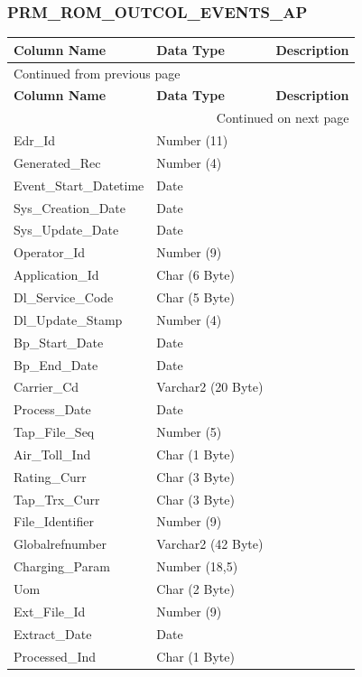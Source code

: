 \documentclass[12pt,twoside]{article}
\begin{document}
\subsubsection{PRM\_ROM\_OUTCOL\_EVENTS\_AP}
\label{sec:orgheadline83}
\footnotesize
\begin{longtable}{l|l|l}
\hline
\textbf{Column Name} & \textbf{Data Type} & \textbf{Description}\\
\hline
\endfirsthead
\multicolumn{3}{l}{Continued from previous page} \\
\hline

\textbf{Column Name} & \textbf{Data Type} & \textbf{Description} \\

\hline
\endhead
\hline\multicolumn{3}{r}{Continued on next page} \\
\endfoot
\endlastfoot
\hline
Edr\_Id & Number (11) & \\
Generated\_Rec & Number (4) & \\
Event\_Start\_Datetime & Date & \\
Sys\_Creation\_Date & Date & \\
Sys\_Update\_Date & Date & \\
Operator\_Id & Number (9) & \\
Application\_Id & Char (6 Byte) & \\
Dl\_Service\_Code & Char (5 Byte) & \\
Dl\_Update\_Stamp & Number (4) & \\
Bp\_Start\_Date & Date & \\
Bp\_End\_Date & Date & \\
Carrier\_Cd & Varchar2 (20 Byte) & \\
Process\_Date & Date & \\
Tap\_File\_Seq & Number (5) & \\
Air\_Toll\_Ind & Char (1 Byte) & \\
Rating\_Curr & Char (3 Byte) & \\
Tap\_Trx\_Curr & Char (3 Byte) & \\
File\_Identifier & Number (9) & \\
Globalrefnumber & Varchar2 (42 Byte) & \\
Charging\_Param & Number (18,5) & \\
Uom & Char (2 Byte) & \\
Ext\_File\_Id & Number (9) & \\
Extract\_Date & Date & \\
Processed\_Ind & Char (1 Byte) & \\

\end{longtable}
\end{document}
